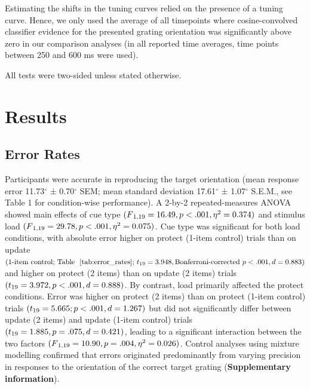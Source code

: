 \documentclass{article}
\begin{document}
Estimating the shifts in the tuning curves relied on the presence of a tuning curve. Hence, we only used the average of all timepoints where cosine-convolved classifier evidence for the presented grating orientation was significantly above zero in our comparison analyses (in all reported time averages, time points between 250 and 600 ms were used). 

All tests were two-sided unless stated otherwise. 


\section{Results}
\subsection{Error Rates}
%



Participants were accurate in reproducing the target orientation (mean response error 11.73$^{\circ}$ ± 0.70$^{\circ}$ SEM; mean standard deviation 17.61$^{\circ}$ ± 1.07$^{\circ}$ S.E.M., see Table 1 for condition-wise performance). A 2-by-2 repeated-measures ANOVA showed main effects of cue type $(F\textsubscript{1,19} = 16.49, p < .001, \eta\textsuperscript{2} = 0.374)$ and stimulus load $(F\textsubscript{1,19} = 29.78, p < .001, \eta\textsuperscript{2} = 0.075)$. 
Cue type was significant for both load conditions, with absolute error higher on protect (1-item control) trials than on update $(\text{1-item control; Table ~\ref{tab:error_rates}; }t\textsubscript{19} = 3.948, \text{Bonferroni-corrected }  p < .001, d = 0.883)$ and higher on protect (2 items) than on update (2 items) trials $(t\textsubscript{19} = 3.972, p < .001, d = 0.888)$. By contrast, load primarily affected the protect conditions. Error was higher on protect (2 items) than on protect (1-item control) trials $(t\textsubscript{19} = 5.665; p < .001, d = 1.267)$ but did not significantly differ between update (2 items) and update (1-item control) trials $(t\textsubscript{19} = 1.885, p = .075, d = 0.421)$, leading to a significant interaction between the two factors $(F\textsubscript{1,19} = 10.90, p = .004, \eta\textsuperscript{2} = 0.026)$. Control analyses using mixture modelling confirmed that errors originated predominantly from varying precision in responses to the orientation of the correct target grating (\textbf{Supplementary information}).
%

  
\bigskip
\end{document}
